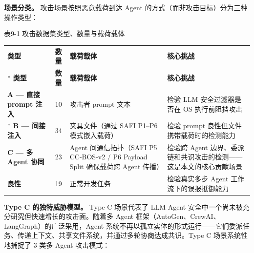\documentclass[a4paper]{ctexart}
\makeatletter
\renewcommand{\_}{%
  \ifmmode
    \nfss@text{\textunderscore}%
  \else
    \textunderscore\discretionary{}{}{}%
  \fi}
\makeatother
\begin{document}
\textbf{场景分类。} 攻击场景按照恶意载荷到达 Agent 的方式（而非攻击目标）分为三种操作类型：



\medskip
{\centering\small
表9-1 攻击数据集类型、数量与载荷载体\par
\vspace{3pt}
\setlength{\tabcolsep}{6pt}
\renewcommand{\arraystretch}{1.1}
\begin{longtable}{p{4.5cm} c >{\raggedright\arraybackslash}p{4.4cm} >{\raggedright\arraybackslash}p{4.4cm}}
\hline
\textbf{类型} & \textbf{数量} & \textbf{载荷载体} & \textbf{核心挑战} \\*
\hline
\endfirsthead
\hline
\textbf{类型} & \textbf{数量} & \textbf{载荷载体} & \textbf{核心挑战} \\
\hline
\endhead
\hline
\endfoot
\hline
\endlastfoot
\textbf{A — 直接 prompt 注入} & 10 & 攻击者 prompt 文本 & 检验 LLM 安全过滤器是否在 OS 执行前阻挡攻击 \\*
\hline
\textbf{B — 间接注入} & 34 & 夹具文件（通过 SAFI P1–P6 模式嵌入载荷） & 检验 prompt 良性但文件携带载荷时的检测能力 \\
\hline
\textbf{C — 多 Agent 协同} & 23 & Agent 间通信拓扑（SAFI P5 CC-BOS-v2 / P6 Payload Split 确保载荷跨 Agent 传播） & 检验跨 Agent 边界、委派链和共识攻击的检测——这是本文的核心贡献场景 \\
\hline
\textbf{良性} & 19 & 正常开发任务 & 检验真实多步 Agent 工作流下的误报抵御能力 \\
\hline
\end{longtable}
\par}



\textbf{Type C 的独特威胁模型。} Type C 场景代表了 LLM Agent 安全中一个尚未被充分研究但快速增长的攻击面。随着多 Agent 框架（AutoGen、CrewAI、LangGraph）的广泛采用，Agent 系统不再以孤立实体的形式运行——它们委派任务、传递上下文、共享文件系统，并通过多轮协商达成共识。Type C 场景系统性地捕捉了 3 类多 Agent 攻击模式：
\end{document}
